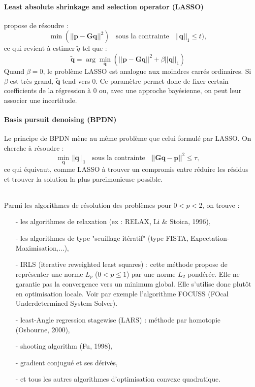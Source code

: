 \paragraph{\tbullet  Least absolute shrinkage and selection operator (LASSO)} \cite{Tibshirani1996} propose de résoudre :
\begin{equation}
\min(||\bm{p}-\bm{Gq}||^2) ~~~~\text{sous la contrainte}~~~~||\bm{q}||_1\leq t),
\end{equation}
ce qui revient à estimer $\tilde{q}$ tel que : 
\begin{equation}
\bm{\tilde{q}} = \arg\min_{\bm{q}} \left( ||\bm{p}- \bm{Gq}||^2 + \beta ||\bm{q}||_1 \right)
\end{equation}
Quand $\beta=0$, le problème LASSO est analogue aux moindres carrés ordinaires. Si $\beta$ est très grand, $\bm{\tilde{q}}$ tend vers 0. Ce paramètre permet donc de fixer certain coefficients de la régression à 0 ou, avec une approche bayésienne, on peut leur associer une incertitude.

\paragraph{\tbullet  Basis pursuit denoising (BPDN)} Le principe de BPDN mène au même problème que celui formulé par LASSO. On cherche à résoudre :
\begin{equation}
\min_{\bm{q}} ||\bm{q}||_1 ~~~~\text{sous la contrainte}~~~~ ||\bm{Gq}-\bm{p}||^2 \leq \tau,
\end{equation}
ce qui équivaut, comme LASSO à trouver un compromis entre réduire les résidus et trouver la solution la plus parcimonieuse possible.


~\\Parmi les algorithmes de résolution des problèmes pour $0<p<2$, on trouve : 
\begin{itemize}
	\item[-] les algorithmes de relaxation (ex : RELAX, Li \& Stoica, 1996),
	\item[-] les algorithmes de type "seuillage itératif" (type FISTA, Expectation-Maximisation,...),
	\item[-] IRLS (iterative reweighted least squares) : cette méthode propose de représenter une norme $L_p$ ($0<p\leq1$) par une norme $L_2$ pondérée.  %
	 Elle ne garantie pas la convergence vers un minimum global. Elle s'utilise donc plutôt en optimisation locale. Voir par exemple l'algorithme FOCUSS (FOcal Underdetermined System Solver).
	\item[-] least-Angle regression stagewise (LARS) : méthode par homotopie (Osbourne, 2000),
	\item[-] shooting algorithm (Fu, 1998),
	\item[-] gradient conjugué et ses dérivés,
	\item[-] et tous les autres algorithmes d'optimisation convexe quadratique.
\end{itemize}

